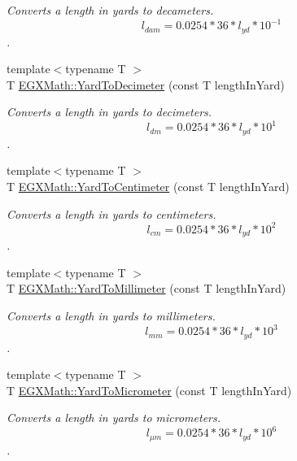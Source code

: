 \begin{DoxyCompactItemize}
\begin{DoxyCompactList}\small\item\em Converts a length in yards to decameters. \[ l_{dam}=0.0254 * 36 * l_{yd} * 10^{-1} \]. \end{DoxyCompactList}\item 
{\footnotesize template$<$typename T $>$ }\\T \mbox{\hyperlink{group___e_g_x_math-_conversions-_length_conversions-_imperial-_yard-_s_i_ga2d9f995bf166959fcfdcceb61e6b6062}{E\+G\+X\+Math\+::\+Yard\+To\+Decimeter}} (const T length\+In\+Yard)
\begin{DoxyCompactList}\small\item\em Converts a length in yards to decimeters. \[ l_{dm}=0.0254 * 36 * l_{yd} * 10^{1} \]. \end{DoxyCompactList}\item 
{\footnotesize template$<$typename T $>$ }\\T \mbox{\hyperlink{group___e_g_x_math-_conversions-_length_conversions-_imperial-_yard-_s_i_gaf49d610207ac1f0469190e6a06d10a42}{E\+G\+X\+Math\+::\+Yard\+To\+Centimeter}} (const T length\+In\+Yard)
\begin{DoxyCompactList}\small\item\em Converts a length in yards to centimeters. \[ l_{cm}=0.0254 * 36 * l_{yd} * 10^{2} \]. \end{DoxyCompactList}\item 
{\footnotesize template$<$typename T $>$ }\\T \mbox{\hyperlink{group___e_g_x_math-_conversions-_length_conversions-_imperial-_yard-_s_i_ga54f92a3a4238cd856ba21bdf1fe65d23}{E\+G\+X\+Math\+::\+Yard\+To\+Millimeter}} (const T length\+In\+Yard)
\begin{DoxyCompactList}\small\item\em Converts a length in yards to millimeters. \[ l_{mm}=0.0254 * 36 * l_{yd} * 10^{3} \]. \end{DoxyCompactList}\item 
{\footnotesize template$<$typename T $>$ }\\T \mbox{\hyperlink{group___e_g_x_math-_conversions-_length_conversions-_imperial-_yard-_s_i_ga9197b0613b2b3a04b62d194f04bb3692}{E\+G\+X\+Math\+::\+Yard\+To\+Micrometer}} (const T length\+In\+Yard)
\begin{DoxyCompactList}\small\item\em Converts a length in yards to micrometers. \[ l_{\mu m}=0.0254 * 36 * l_{yd} * 10^{6} \]. \end{DoxyCompactList}\item 

\end{DoxyCompactItemize}
